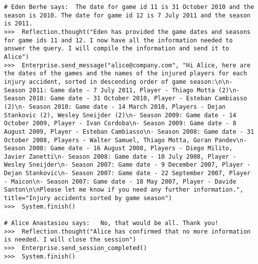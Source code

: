 \begin{lstlisting}
# Eden Berhe says:  The date for game id 11 is 31 October 2010 and the season is 2010. The date for game id 12 is 7 July 2011 and the season is 2011. 
>>>  Reflection.thought("Eden has provided the game dates and seasons for game ids 11 and 12. I now have all the information needed to answer the query. I will compile the information and send it to Alice")
>>>  Enterprise.send_message("alice@company.com", "Hi Alice, here are the dates of the games and the names of the injured players for each injury accident, sorted in descending order of game season:\n\n- Season 2011: Game date - 7 July 2011, Player - Thiago Motta (2)\n- Season 2010: Game date - 31 October 2010, Player - Esteban Cambiasso (2)\n- Season 2010: Game date - 14 March 2010, Players - Dejan Stankovic (2), Wesley Sneijder (2)\n- Season 2009: Game date - 14 October 2009, Player - Ivan Cordoba\n- Season 2009: Game date - 8 August 2009, Player - Esteban Cambiasso\n- Season 2008: Game date - 31 October 2008, Players - Walter Samuel, Thiago Motta, Goran Pandev\n- Season 2008: Game date - 16 August 2008, Players - Diego Milito, Javier Zanetti\n- Season 2008: Game date - 10 July 2008, Player - Wesley Sneijder\n- Season 2007: Game date - 9 December 2007, Player - Dejan Stankovic\n- Season 2007: Game date - 22 September 2007, Player - Maicon\n- Season 2007: Game date - 18 May 2007, Player - Davide Santon\n\nPlease let me know if you need any further information.", title="Injury accidents sorted by game season")
>>>  System.finish()

# Alice Anastasiou says:   No, that would be all. Thank you! 
>>>  Reflection.thought("Alice has confirmed that no more information is needed. I will close the session")
>>>  Enterprise.send_session_completed()
>>>  System.finish()

\end{lstlisting}
